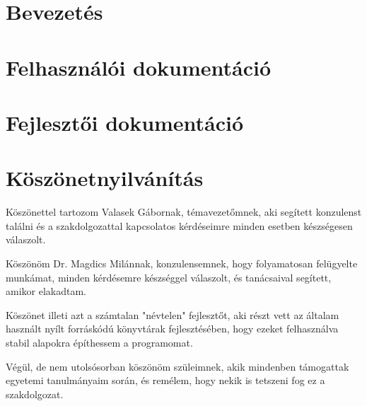 \documentclass[12pt,oneside]{report}
\begin{document}


\tableofcontents

\chapter{Bevezetés}


\chapter{Felhasználói dokumentáció}


\chapter{Fejlesztői dokumentáció}


\chapter*{Köszönetnyilvánítás}

Köszönettel tartozom Valasek Gábornak, témavezetőmnek, aki segített konzulenst találni és a szakdolgozattal kapcsolatos kérdéseimre minden esetben készségesen válaszolt.

Köszönöm Dr. Magdics Milánnak, konzulensemnek, hogy folyamatosan felügyelte munkámat, minden kérdésemre készséggel válaszolt, és tanácsaival segített, amikor elakadtam.

Köszönet illeti azt a számtalan "névtelen" fejlesztőt, aki részt vett az általam használt nyílt forráskódú könyvtárak fejlesztésében, hogy ezeket felhasználva stabil alapokra építhessem a programomat.

Végül, de nem utolsósorban köszönöm szüleimnek, akik mindenben támogattak egyetemi tanulmányaim során, és remélem, hogy nekik is tetszeni fog ez a szakdolgozat.
\end{document}
